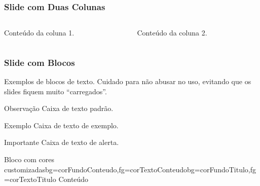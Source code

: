 \begin{frame}

    \frametitle{Slide com Duas Colunas}
    
    \begin{columns}[t]
    
        \begin{column}{7cm}

            Conteúdo da coluna 1.

        \end{column}

        \begin{column}{7cm}

            Conteúdo da coluna 2.

        \end{column}

    \end{columns}
        
\end{frame}


\begin{frame}

    \frametitle{Slide com Blocos}
    
    Exemplos de blocos de texto. Cuidado para não abusar no uso, evitando que os slides fiquem muito ``carregados''.
    
    \begin{block}{Observação}
        Caixa de texto padrão.
    \end{block}
    
    \begin{exampleblock}{Exemplo}
        Caixa de texto de exemplo.
    \end{exampleblock}
        
    \begin{alertblock}{Importante}
        Caixa de texto de alerta.
    \end{alertblock}
    
    \begin{bloco}{Bloco com cores customizadas}{bg=corFundoConteudo,fg=corTextoConteudo}{bg=corFundoTitulo,fg=corTextoTitulo}
        Conteúdo
    \end{bloco}
         
\end{frame}


